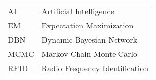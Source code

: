 \begin{table*}[!h]
{\renewcommand{\arraystretch}{1.3} %
  \begin{tabular}{p{1 in} l}
    AI		& 	Artificial Intelligence \\
    EM		& 	Expectation-Maximization \\
    DBN		& 	Dynamic Bayesian Network \\
    MCMC		& 	Markov Chain Monte Carlo \\
    RFID		& 	Radio Frequency Identification
  \end{tabular}
}
\end{table*}